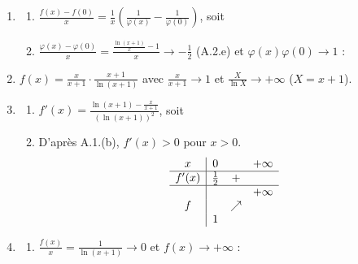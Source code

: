 \begin{description}
\begin{enumerate}
			Comme $\varphi(0) \neq 0$, $f = \frac{1}{\varphi}$ est aussi continue à droite en $0$.
			\par\noindent{}
		\item
		\begin{enumerate}
			\item {}
				$\frac{f(x) - f(0)}{x} = \frac{1}{x}\left(\frac{1}{\varphi(x)} - \frac{1}{\varphi(0)}\right)$, soit
				\par\noindent{}
			\item {}
				$\frac{\varphi(x) - \varphi(0)}{x} = \frac{\frac{\ln(x+1)}{x} - 1}{x} \to -\frac{1}{2}$ (A.2.e) et $\varphi(x)\varphi(0) \to 1$ :
				\par\noindent{}
		\end{enumerate}
		\item {}
			$f(x) = \frac{x}{x+1}\cdot\frac{x+1}{\ln(x+1)}$ avec $\frac{x}{x+1} \to 1$ et $\frac{X}{\ln X} \to +\infty$ ($X = x + 1$).
			\par\noindent{}
		\item
		\begin{enumerate}
			\item {}
				$f'(x) = \frac{\ln(x+1) - \frac{x}{x+1}}{\left(\ln(x+1)\right)^2}$, soit \par\noindent{}
			\item {}
				D'après A.1.(b), $f'(x) > 0$ pour $x > 0$.
				\[
				\begin{array}{c|ccc}
					x & 0 & & +\infty \\ \hline
					f'(x) & \frac{1}{2} & + & \\ \hline
					 & & & +\infty \\
					f & & \nearrow & \\
					 & 1 & &
				\end{array}
				\]
		\end{enumerate}
		\item
		\begin{enumerate}
			\item {}
				$\frac{f(x)}{x} = \frac{1}{\ln(x+1)} \to 0$ et $f(x) \to +\infty$ : \par\noindent{}

\end{enumerate}
\end{enumerate}
\end{description}
